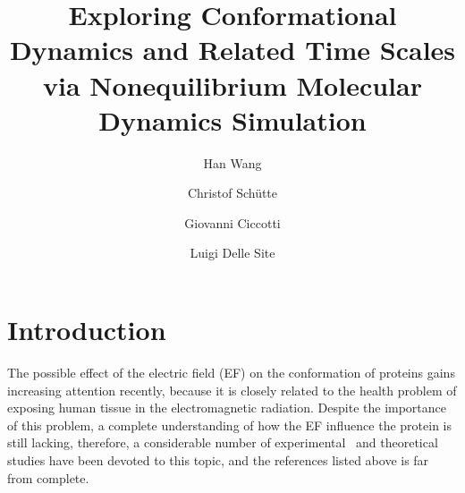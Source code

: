 \documentclass[a4paper,preprint,unsortedaddress,onecolumn]{revtex4-1}
\begin{document}
\title{Exploring Conformational Dynamics and Related Time Scales via Nonequilibrium Molecular Dynamics Simulation}
\author{Han Wang}
\author{Christof Sch\"utte}
\author{Giovanni Ciccotti}
\author{Luigi Delle Site}

\begin{abstract}
\end{abstract}

\maketitle


\section{Introduction}


The possible effect of the electric field (EF) on the conformation of
proteins gains increasing attention recently, because it is closely
related to the health problem of exposing human tissue in the
electromagnetic radiation. Despite the importance of this problem, a
complete understanding of how the EF influence the  protein
is still lacking, therefore, a considerable number of
experimental~\cite{bohr2000microwave, bohr2000microwave-1,
  dePomerai2000cell, inskip2001cellular, mancinelli2004non} and
theoretical~\cite{budi2005electric, budi2007effect,
  budi2008comparative, toschi2008effects, astrakas2011electric,
  astrakas2012structural, damm2012can, starzyk2013proteins,
  english2009nonequilibrium, solomentsev2012effects} studies have been devoted to this topic,
and the references listed above is far from complete.
\end{document}
